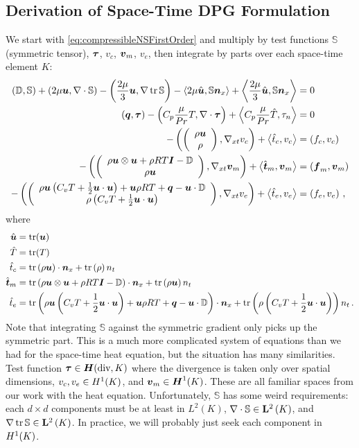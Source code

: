 \documentclass[Proposal.tex]{subfiles}
\begin{document}
\subsection{Derivation of Space-Time DPG Formulation}
We start with \eqref{eq:compressibleNSFirstOrder} and multiply by test functions $\mathbb{S}$ (symmetric tensor), $\boldsymbol\tau$, $v_c$, $\boldsymbol v_m$, $v_e$, 
then integrate by parts over each space-time element $K$:
\begin{subequations}
\label{eq:compressibleNSBF}
\begin{align}
	\left( \mathbb{D},\mathbb{S} \right)+\left( 2\mu\boldsymbol u,\nabla\cdot\mathbb{S} \right)-\left( \frac{2\mu}{3}\boldsymbol u,\nabla\operatorname*{tr}{\mathbb{S}} \right)
	-\left\langle 2\mu\hat{\boldsymbol u},\mathbb{S}\boldsymbol n_x \right\rangle+\left\langle \frac{2\mu}{3}\hat{\boldsymbol u},\mathbb{S}\boldsymbol n_x \right\rangle&=0\\
	\left( \boldsymbol q,\boldsymbol\tau \right)-\left( C_p\frac{\mu}{Pr}T,\nabla\cdot\boldsymbol\tau \right)+\left\langle C_p\frac{\mu}{Pr}\hat T,\tau_n \right\rangle&=0\\
	-\left( \left( \begin{array}{c} \rho\boldsymbol u\\ \rho\\ \end{array} \right),\nabla_{xt} v_c \right)+\left\langle \hat t_c,v_c \right\rangle&=\left( f_c,v_c \right)\\
	-\left( \left( \begin{array}{c} \rho\boldsymbol u\otimes\boldsymbol u+\rho RT\boldsymbol I-\mathbb{D}\\ \rho\boldsymbol u\\ \end{array} \right),\nabla_{xt}\boldsymbol v_m \right)+\left\langle \hat{\boldsymbol t}_m,\boldsymbol v_m \right\rangle&=\left( \boldsymbol f_m,\boldsymbol v_m \right)\\
	-\left( \left( \begin{array}{c} \rho\boldsymbol u\left( C_v T+\frac{1}{2}\boldsymbol u\cdot\boldsymbol u \right)+\boldsymbol u\rho RT+\boldsymbol q-\boldsymbol u\cdot\mathbb{D}\\ \rho\left( C_v T+\frac{1}{2}\boldsymbol u\cdot\boldsymbol u \right)\\ \end{array} \right),\nabla_{xt} v_e \right)
	+\left\langle \hat t_e,v_e \right\rangle&=\left( f_e,v_e \right)\,,
\end{align}
\end{subequations}
where 
\begin{equation*}
\begin{aligned}
\hat{\boldsymbol u}&=\operatorname*{tr}(\boldsymbol u)\\
\hat T&=\operatorname*{tr}(T)\\
\hat t_c&=\operatorname*{tr}\left( \rho\boldsymbol u \right)\cdot\boldsymbol n_x
+\operatorname*{tr}\left( \rho \right)n_t\\
\hat{\boldsymbol t}_m&=\operatorname*{tr}\left( \rho\boldsymbol u\otimes\boldsymbol u+\rho RT\boldsymbol I-\mathbb{D} \right)\cdot\boldsymbol n_x
+\operatorname*{tr}\left( \rho\boldsymbol u \right) n_t\\
\hat t_e&=\operatorname*{tr}\left( \rho\boldsymbol u\left( C_v T+\frac{1}{2}\boldsymbol u\cdot\boldsymbol u \right)+\boldsymbol u\rho RT+\boldsymbol q-\boldsymbol u\cdot\mathbb{D} \right)\cdot\boldsymbol n_x
+\operatorname*{tr}\left( \rho\left( C_v T+\frac{1}{2}\boldsymbol u\cdot\boldsymbol u \right) \right)n_t\,.
\end{aligned}
\end{equation*}
Note that integrating $\mathbb{S}$ against the symmetric gradient only picks up the symmetric part.
This is a much more complicated system of equations than we had for the space-time heat equation, but the situation has many similarities.
Test function $\boldsymbol\tau\in\mbox{\boldmath $H$}(\text{div},K)$ where the divergence is taken only over spatial dimensions, $v_c,v_e\in H^{1}(K)$, and $\boldsymbol v_m\in\mbox{\boldmath $H$}^{1}(K)$.
These are all familiar spaces from our work with the heat equation.
Unfortunately, $\mathbb{S}$ has some weird requirements: each $d\times d$ components must be at least in $L^2(K)$, $\nabla\cdot\mathbb{S}\in\mathbf{L}^2\left( K \right)$, and
$\nabla\operatorname*{tr}{\mathbb{S}}\in\mathbf{L}^2\left( K \right)$.
In practice, we will probably just seek each component in $H^{1}(K)$.
\end{document}

